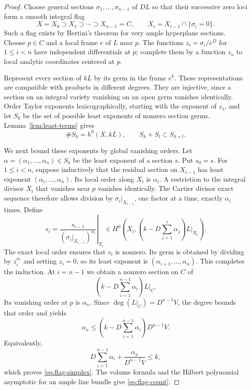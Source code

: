 \begin{proof}
Choose general sections $\sigma_1,\ldots,\sigma_{n-1}$ of $DL$ so that
their successive zero loci form a smooth integral flag
\[
 X=X_0\supset X_1\supset\cdots\supset X_{n-1}=C,
 \qquad
 X_i=X_{i-1}\cap\{\sigma_i=0\}.
\]
Such a flag exists by Bertini's theorem for very ample hyperplane sections.
Choose $p\in C$ and a local frame $e$ of $L$ near $p$. The functions
$z_i=\sigma_i/e^D$ for $1\leq i<n$ have independent differentials at $p$;
complete them by a function $z_n$ to local analytic coordinates centered
at $p$.

Represent every section of $kL$ by its germ in the frame $e^k$. These
representations are compatible with products in different degrees. They
are injective, since a section on an integral variety vanishing on an open
germ vanishes identically. Order Taylor exponents lexicographically,
starting with the exponent of $z_1$, and let $S_k$ be the set of possible
least exponents of nonzero section germs. Lemma~\ref{lem:least-terms}
gives
\[
 \#S_k=h^0(X,kL),\qquad S_k+S_l\subset S_{k+l}.
\]

We next bound these exponents by global vanishing orders. Let
$\alpha=(\alpha_1,\ldots,\alpha_n)\in S_k$ be the least exponent of a
section $s$. Put $s_0=s$. For $1\leq i<n$, suppose inductively that the residual section on
$X_{i-1}$ has least exponent $(\alpha_i,\ldots,\alpha_n)$. Its local
order along $X_i$ is $\alpha_i$. A restriction to the integral divisor
$X_i$ that vanishes near $p$ vanishes identically. The Cartier divisor
exact sequence therefore allows division by
$\sigma_i|_{X_{i-1}}$, one factor at a time, exactly $\alpha_i$ times.
Define
\[
 s_i=
 \left.
 \frac{s_{i-1}}{(\sigma_i|_{X_{i-1}})^{\alpha_i}}
 \right|_{X_i}
 \in H^0\left(X_i,
       \left(k-D\sum_{j=1}^i\alpha_j\right)L|_{X_i}\right).
\]
The exact local order ensures that $s_i$ is nonzero. Its germ is obtained
by dividing by $z_i^{\alpha_i}$ and setting $z_i=0$, so its least exponent
is $(\alpha_{i+1},\ldots,\alpha_n)$. This completes the induction. At
$i=n-1$ we obtain a nonzero section on $C$ of
\[
 \left(k-D\sum_{i=1}^{n-1}\alpha_i\right)L|_C.
\]
Its vanishing order at $p$ is $\alpha_n$. Since
$\deg(L|_C)=D^{n-1}V$, the degree bounds that order and yields
\[
 \alpha_n\leq
 \left(k-D\sum_{i=1}^{n-1}\alpha_i\right)D^{n-1}V.
\]
Equivalently,
\[
 D\sum_{i=1}^{n-1}\alpha_i+
 \frac{\alpha_n}{D^{n-1}V}\leq k,
\]
which proves \eqref{eq:flag-simplex}. The volume formula and the Hilbert
polynomial asymptotic for an ample line bundle give
\eqref{eq:flag-count}.


\end{proof}
